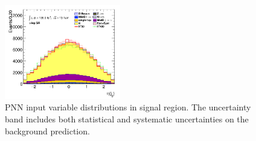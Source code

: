 \begin{figure}[!htp]
\begin{center}
			\includegraphics[width=0.45\textwidth]{chapters/chapter6_HPlus/images/taulep/jet_0_eta_SR_TAULEP.png} 
			\end{center}
			\caption{
			PNN input variable distributions in \taulep signal region. The uncertainty band includes both statistical and systematic uncertainties on the background prediction. 
			}
			\label{fig:sr-taulep-3}
		\end{figure}

